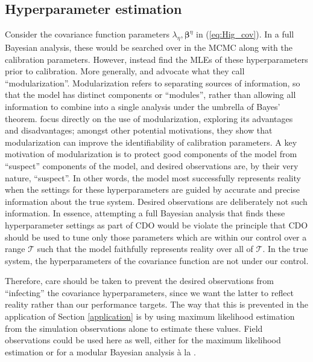 \documentclass{article}
\begin{document}
\subsection{Hyperparameter estimation}\label{hyperparameter_estimation}
Consider the covariance function parameters $\lambda_\eta,\boldsymbol \beta^\eta$ in (\ref{eq:Hig_cov}). 
In a full Bayesian analysis, these would be searched over in the MCMC along with the calibration parameters. 
However, \cite{Kennedy2001} instead find the MLEs of these hyperparameters prior to calibration. 
More generally, \cite{Bayarri2007}and \cite{Liu2009} advocate what they call ``modularization''. 
Modularization refers to separating sources of information, so that the model has distinct components or ``modules'', rather than allowing all information to combine into a single analysis under the umbrella of Bayes' theorem. \cite{Liu2009} focus directly on the use of modularization, exploring its advantages and disadvantages; amongst other potential motivations, they show that modularization can improve the identifiability of calibration parameters. 
A key motivation of modularization is to protect good components of the model from ``suspect'' components of the model, and desired observations are, by their very nature, ``suspect''. 
In other words, the model most successfully represents reality when the settings for these hyperparameters are guided by accurate and precise information about the true system. 
Desired observations are deliberately not such information. 
In essence, attempting a full Bayesian analysis that finds these hyperparameter settings as part of CDO would be violate the principle that CDO should be used to tune only those parameters which are within our control over a range $\mathcal T$ such that the model faithfully represents reality over all of $\mathcal T$. 
In the true system, the hyperparameters of the covariance function are not under our control.

Therefore, care should be taken to prevent the desired observations from ``infecting'' the covariance hyperparameters, since we want the latter to reflect reality rather than our performance targets. The way that this is prevented in the application of Section \ref{application} is by using maximum likelihood estimation from the simulation observations alone to estimate these values. Field observations could be used here as well, either for the maximum likelihood estimation or for a modular Bayesian analysis \`a la \cite{Liu2009}.
\end{document}
